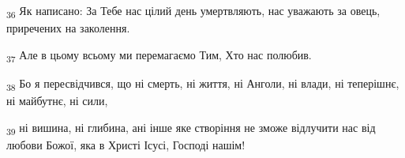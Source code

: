 \begin{tcolorbox}
\textsubscript{36} Як написано: За Тебе нас цілий день умертвляють, нас уважають за овець, приречених на заколення.
\end{tcolorbox}
\begin{tcolorbox}
\textsubscript{37} Але в цьому всьому ми перемагаємо Тим, Хто нас полюбив.
\end{tcolorbox}
\begin{tcolorbox}
\textsubscript{38} Бо я пересвідчився, що ні смерть, ні життя, ні Анголи, ні влади, ні теперішнє, ні майбутнє, ні сили,
\end{tcolorbox}
\begin{tcolorbox}
\textsubscript{39} ні вишина, ні глибина, ані інше яке створіння не зможе відлучити нас від любови Божої, яка в Христі Ісусі, Господі нашім!
\end{tcolorbox}
